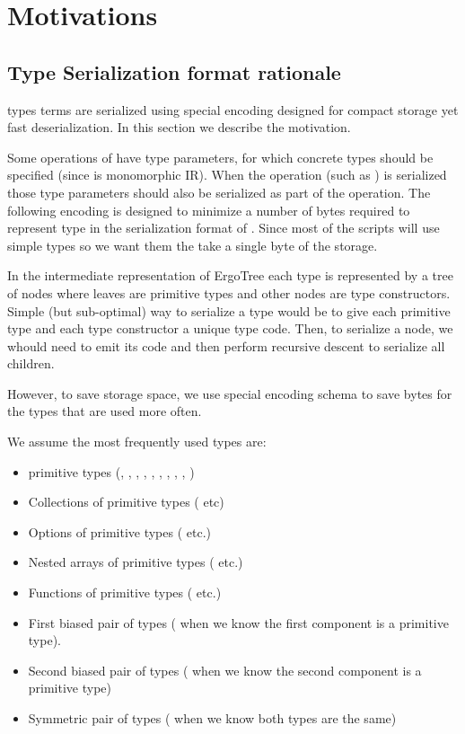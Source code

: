 \section{Motivations}
\label{sec:appendix:motivation}

\subsection{Type Serialization format rationale}
\label{sec:appendix:motivation:type}

\langname types terms are serialized using special encoding designed for compact
storage yet fast deserialization. In this section we describe the motivation.

Some operations of \ASDag have type parameters, for which concrete types should be
specified (since \ASDag is monomorphic IR). When the operation (such as
\hyperref[sec:serialization:operation:ExtractRegisterAs]{}) is
serialized those type parameters should also be serialized as part of the operation.
The following encoding is designed to minimize a number of bytes required to represent
type in the serialization format of \ASDag. Since most of the scripts will use simple
types so we want them the take a single byte of the storage.

In the intermediate representation of ErgoTree each type is represented by a tree of
nodes where leaves are primitive types and other nodes are type constructors. Simple
(but sub-optimal) way to serialize a type would be to give each primitive type and each
type constructor a unique type code. Then, to serialize a node, we whould need to emit
its code and then perform recursive descent to serialize all children.

However, to save storage space, we use special encoding schema to save bytes
for the types that are used more often.

We assume the most frequently used types are:
\begin{itemize}
    \item primitive types (, , , , , , ,
    , , )
    \item  Collections of primitive types ( etc)
    \item  Options of primitive types ( etc.)
    \item Nested arrays of primitive types ( etc.)
    \item Functions of primitive types ( etc.)
    \item First biased pair of types ( when we know the first
    component is a primitive type).
    \item Second biased pair of types ( when we know the second
    component is a primitive type)
    \item Symmetric pair of types ( when we know both types are
    the same)
\end{itemize}

